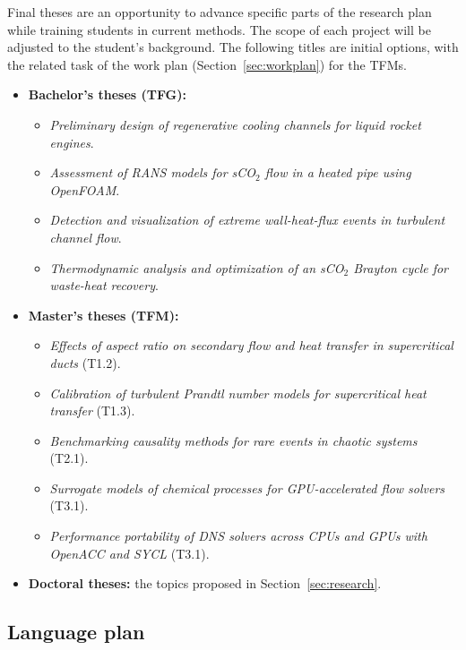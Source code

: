 \documentclass[11pt]{article}
\begin{document}
Final theses are an opportunity to advance specific parts of the research plan while training students in current methods. 
The scope of each project will be adjusted to the student's background. 
The following titles are initial options, with the related task of the work plan (Section~\ref{sec:workplan}) for the TFMs.
\begin{itemize}
  \item \textbf{Bachelor's theses (TFG):}
  \begin{itemize}
    \item \emph{Preliminary design of regenerative cooling channels for liquid rocket engines}.
    \item \emph{Assessment of RANS models for sCO$_2$ flow in a heated pipe using OpenFOAM}.
    \item \emph{Detection and visualization of extreme wall-heat-flux events in turbulent channel flow}.
    \item \emph{Thermodynamic analysis and optimization of an sCO$_2$ Brayton cycle for waste-heat recovery}.
  \end{itemize}
  \item \textbf{Master's theses (TFM):}
  \begin{itemize}
    \item \emph{Effects of aspect ratio on secondary flow and heat transfer in supercritical ducts} (T1.2).
    \item \emph{Calibration of turbulent Prandtl number models for supercritical heat transfer} (T1.3).
    \item \emph{Benchmarking causality methods for rare events in chaotic systems} (T2.1).
    \item \emph{Surrogate models of chemical processes for GPU-accelerated flow solvers} (T3.1).
    \item \emph{Performance portability of DNS solvers across CPUs and GPUs with OpenACC and SYCL} (T3.1).
  \end{itemize}
  \item \textbf{Doctoral theses:} the topics proposed in Section~\ref{sec:research}.
\end{itemize}

\subsection{Language plan}
\end{document}
